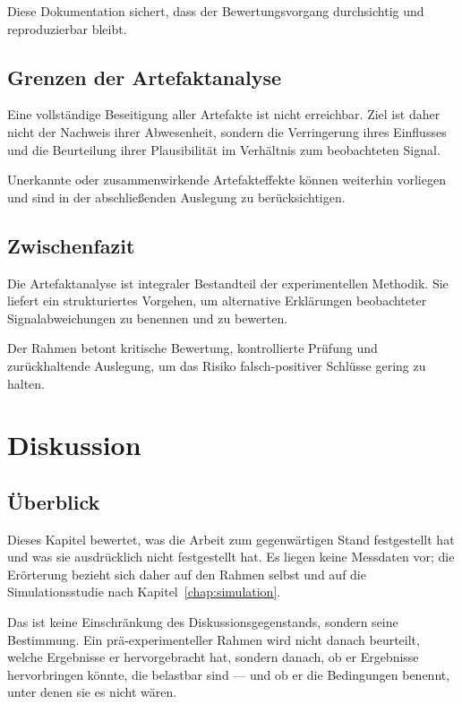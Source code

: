 \documentclass[12pt,a4paper]{report}
\begin{document}
Diese Dokumentation sichert, dass der Bewertungsvorgang durchsichtig und
reproduzierbar bleibt.

\section{Grenzen der Artefaktanalyse}

Eine vollständige Beseitigung aller Artefakte ist nicht erreichbar. Ziel
ist daher nicht der Nachweis ihrer Abwesenheit, sondern die Verringerung
ihres Einflusses und die Beurteilung ihrer Plausibilität im Verhältnis
zum beobachteten Signal.

Unerkannte oder zusammenwirkende Artefakteffekte können weiterhin
vorliegen und sind in der abschließenden Auslegung zu berücksichtigen.

\section{Zwischenfazit}

Die Artefaktanalyse ist integraler Bestandteil der experimentellen
Methodik. Sie liefert ein strukturiertes Vorgehen, um alternative
Erklärungen beobachteter Signalabweichungen zu benennen und zu bewerten.

Der Rahmen betont kritische Bewertung, kontrollierte Prüfung und
zurückhaltende Auslegung, um das Risiko falsch-positiver Schlüsse gering
zu halten.


\chapter{Diskussion}
\label{chap:diskussion}

\section{Überblick}

Dieses Kapitel bewertet, was die Arbeit zum gegenwärtigen Stand
festgestellt hat und was sie ausdrücklich nicht festgestellt hat. Es
liegen keine Messdaten vor; die Erörterung bezieht sich daher auf den
Rahmen selbst und auf die Simulationsstudie nach
Kapitel~\ref{chap:simulation}.

Das ist keine Einschränkung des Diskussionsgegenstands, sondern seine
Bestimmung. Ein prä-experimenteller Rahmen wird nicht danach beurteilt,
welche Ergebnisse er hervorgebracht hat, sondern danach, ob er
Ergebnisse hervorbringen könnte, die belastbar sind --- und ob er die
Bedingungen benennt, unter denen sie es nicht wären.
\end{document}
